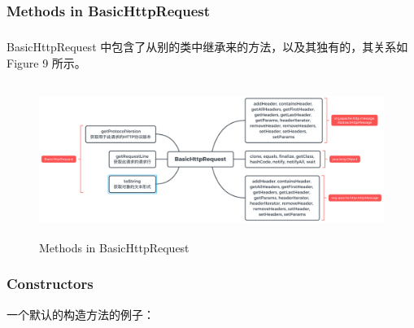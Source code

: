 \documentclass{article}
\begin{document}
	\subsubsection{Methods in BasicHttpRequest}
	\begin{CJK}{UTF8}{gbsn}
		\subparagraph{}
		BasicHttpRequest 中包含了从别的类中继承来的方法，以及其独有的，其关系如 Figure 9 所示。
	\end{CJK}{}
	\begin{figure}[H]
		\centering
		\includegraphics[height = 5cm, width = 15cm]{pics/15_BasicHttpRequest.png}	
		\caption{Methods in BasicHttpRequest}
	\end{figure}

	\subsubsection{Constructors}

	\begin{center}
	\end{center}

	\begin{CJK}{UTF8}{gbsn}
		一个默认的构造方法的例子：
	\end{CJK}{}
\end{document}

